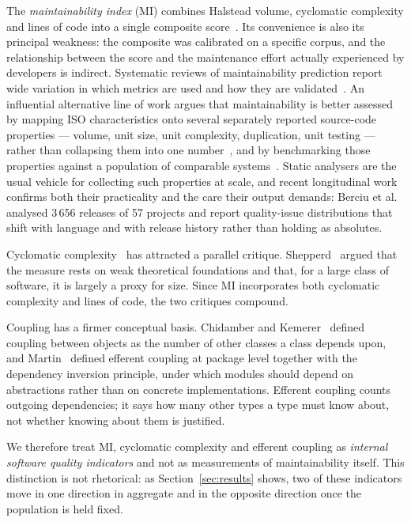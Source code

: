 \documentclass{sbc2019}%
\begin{document}
The \emph{maintainability index} (MI) combines Halstead volume, cyclomatic
complexity and lines of code into a single composite score~\cite{coleman1994}.
Its convenience is also its principal weakness: the
composite was calibrated on a specific corpus, and the relationship between the
score and the maintenance effort actually experienced by developers is
indirect. Systematic reviews of maintainability prediction report wide
variation in which metrics are used and how they are validated~\cite{riaz2009,ardito2020}.
An influential alternative line of work argues that
maintainability is better assessed by mapping ISO characteristics onto several
separately reported source-code properties --- volume, unit size, unit
complexity, duplication, unit testing --- rather than collapsing them into one
number~\cite{heitlager2007}, and by benchmarking those properties against a
population of comparable systems~\cite{baggen2012}. Static analysers are the
usual vehicle for collecting such properties at scale, and recent longitudinal
work confirms both their practicality and the care their output demands: Berciu
et al.\ \cite{berciu2026} analysed 3\,656 releases of 57 projects and report
quality-issue distributions that shift with language and with release history
rather than holding as absolutes.

Cyclomatic complexity~\cite{mccabe1976} has attracted a parallel critique.
Shepperd~\cite{shepperd1988} argued that the measure rests on weak theoretical
foundations and that, for a large class of software, it is largely a proxy for
size. Since MI incorporates both cyclomatic complexity and lines of code, the
two critiques compound.

Coupling has a firmer conceptual basis. Chidamber and Kemerer~\cite{chidamber1994}
defined coupling between objects as the number of other
classes a class depends upon, and Martin~\cite{martin2003} defined efferent
coupling at package level together with the dependency inversion principle,
under which modules should depend on abstractions rather than on concrete
implementations. Efferent coupling counts outgoing dependencies; it says how
many other types a type must know about, not whether knowing about them is
justified.

We therefore treat MI, cyclomatic complexity and efferent coupling as
\emph{internal software quality indicators} and not as measurements of
maintainability itself. This distinction is not rhetorical: as
Section~\ref{sec:results} shows, two of these indicators move in one direction
in aggregate and in the opposite direction once the population is held fixed.
\end{document}

